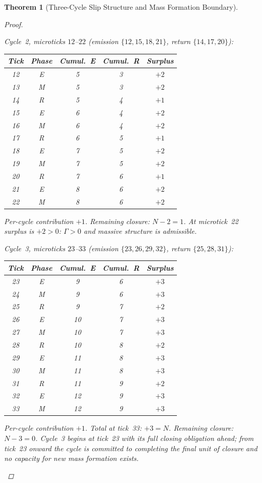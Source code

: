 \documentclass[11pt, letterpaper]{article}
\newcommand{\Tcharge}{\Gamma}
\theoremstyle{definition}
\theoremstyle{plain}
\newtheorem{theorem}{Theorem}[section]
\begin{document}
\begin{theorem}[Three-Cycle Slip Structure and Mass Formation Boundary]
\begin{proof}
\begin{rsbox}
\textit{Cycle~2, microticks $12$--$22$} (emission $\{12,15,18,21\}$,
return $\{14,17,20\}$):
\begin{center}
\small
\begin{tabular}{ccccc}
\toprule
Tick & Phase & Cumul.\ E & Cumul.\ R & Surplus \\
\midrule
12&E&5&3&$+2$\\13&M&5&3&$+2$\\14&R&5&4&$+1$\\
15&E&6&4&$+2$\\16&M&6&4&$+2$\\17&R&6&5&$+1$\\
18&E&7&5&$+2$\\19&M&7&5&$+2$\\20&R&7&6&$+1$\\
21&E&8&6&$+2$\\22&M&8&6&$+2$\\
\bottomrule
\end{tabular}
\end{center}
Per-cycle contribution $+1$.  Remaining closure: $N-2=1$.  At microtick~22
surplus is $+2>0$: $\Tcharge>0$ and massive structure is admissible.

\textit{Cycle~3, microticks $23$--$33$} (emission $\{23,26,29,32\}$,
return $\{25,28,31\}$):
\begin{center}
\small
\begin{tabular}{ccccc}
\toprule
Tick & Phase & Cumul.\ E & Cumul.\ R & Surplus \\
\midrule
23&E&9&6&$+3$\\24&M&9&6&$+3$\\25&R&9&7&$+2$\\
26&E&10&7&$+3$\\27&M&10&7&$+3$\\28&R&10&8&$+2$\\
29&E&11&8&$+3$\\30&M&11&8&$+3$\\31&R&11&9&$+2$\\
32&E&12&9&$+3$\\33&M&12&9&$+3$\\
\bottomrule
\end{tabular}
\end{center}
Per-cycle contribution $+1$.  Total at tick~33: $+3=N$.  Remaining closure:
$N-3=0$.  Cycle~3 begins at tick~23 with its full closing obligation ahead;
from tick~23 onward the cycle is committed to completing the final unit of
closure and no capacity for new mass formation exists.
\end{rsbox}
\end{proof}
\end{theorem}
\end{document}
